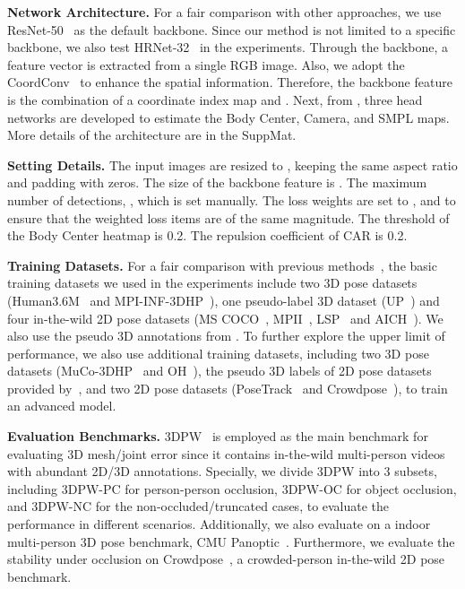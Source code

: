 \documentclass[10pt,twocolumn,letterpaper]{article}
\begin{document}
\textbf{Network Architecture.} 
For a fair comparison with other approaches, we use ResNet-50~\cite{resnet} as the default backbone.
Since our method is not limited to a specific backbone, we also test HRNet-32~\cite{cheng2020bottom} in the experiments.
Through the backbone, a feature vector  is extracted from a single RGB image. 
Also, we adopt the CoordConv~\cite{liu2018coordconv} to enhance the spatial information.
Therefore, the backbone feature  is the combination of a coordinate index map  and .
Next, from , three head networks are developed to estimate the Body Center, Camera, and SMPL maps. 
More details of the architecture are in the SuppMat.

\textbf{Setting Details.} 
The input images are resized to , keeping the same aspect ratio and padding with zeros. 
The size of the backbone feature is . 
The maximum number of detections, , which is set manually. 
The loss weights are set to , and  to ensure that the weighted loss items are of the same magnitude.
The threshold  of the Body Center heatmap is 0.2. The repulsion coefficient  of CAR is 0.2. 

\textbf{Training Datasets.}
For a fair comparison with previous methods~\cite{jiang2020coherent,hmr,kolotouros2019spin,sun2019dsd-satn}, the basic training datasets we used in the experiments include two 3D pose datasets (Human3.6M~\cite{h36m} and MPI-INF-3DHP~\cite{mono-3dhp2017}), one pseudo-label 3D dataset (UP~\cite{unite}) and four in-the-wild 2D pose datasets (MS COCO~\cite{coco}, MPII~\cite{mpii}, LSP~\cite{lsp,lsp_extended} and AICH~\cite{aich}). 
We also use the pseudo 3D annotations from \cite{kolotouros2019spin}. 
To further explore the upper limit of performance, we also use additional training datasets, including two 3D pose datasets (MuCo-3DHP~\cite{mono-3dhp2017} and OH~\cite{zhang2020object}), the pseudo 3D labels of 2D pose datasets provided by~\cite{joo2020eft}, and two 2D pose datasets (PoseTrack~\cite{PoseTrack} and Crowdpose~\cite{crowdpose}), to train an advanced model.

\textbf{Evaluation Benchmarks.} 
3DPW~\cite{3dpw} is employed as the main benchmark for evaluating 3D mesh/joint error since it contains in-the-wild multi-person videos with abundant 2D/3D annotations.
Specially, we divide 3DPW into 3 subsets, including 3DPW-PC for person-person occlusion, 3DPW-OC for object occlusion, and 3DPW-NC for the non-occluded/truncated cases, to evaluate the performance in different scenarios.
Additionally, we also evaluate on a indoor multi-person 3D pose benchmark, CMU Panoptic~\cite{cmu_panoptic}. 
Furthermore, we evaluate the stability under occlusion on  Crowdpose~\cite{crowdpose}, a crowded-person in-the-wild 2D pose benchmark.
\end{document}

